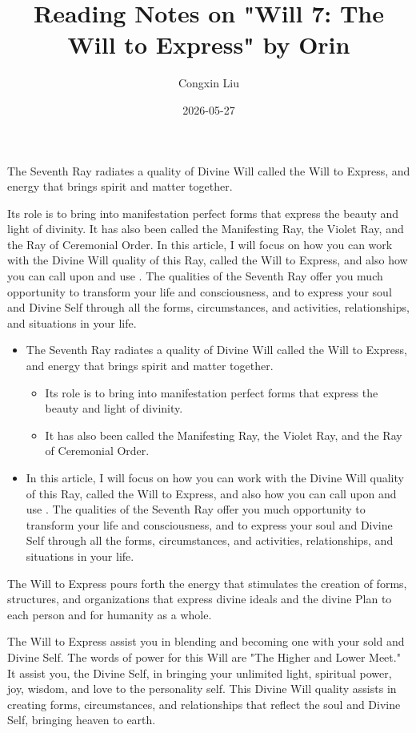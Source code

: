 \documentclass{pensee}
\title{Reading Notes on "Will 7: The Will to Express" by Orin}
\author{Congxin Liu}
\date{2026-05-27}
\begin{document}

The Seventh Ray radiates a quality of Divine Will called the Will to Express, and energy that brings spirit and matter together.

Its role is to bring into manifestation perfect forms that express the beauty and light of divinity.
It has also been called the Manifesting Ray, the Violet Ray, and the Ray of Ceremonial Order.
In this article, I will focus on how you can work with the Divine Will quality of this Ray, called the Will to Express, and also how you can call upon and use .
		\blankline
		The qualities of the Seventh Ray offer you much opportunity to transform your life and consciousness, and to express your soul and Divine Self through all the forms, circumstances, and activities, relationships, and situations in your life.

\begin{itemize}
	\item The Seventh Ray radiates a quality of Divine Will called the Will to Express, and energy that brings spirit and matter together.
		\begin{itemize}
			\item Its role is to bring into manifestation perfect forms that express the beauty and light of divinity.
			\item It has also been called the Manifesting Ray, the Violet Ray, and the Ray of Ceremonial Order.
		\end{itemize}
	\item In this article, I will focus on how you can work with the Divine Will quality of this Ray, called the Will to Express, and also how you can call upon and use .
		\blankline
		The qualities of the Seventh Ray offer you much opportunity to transform your life and consciousness, and to express your soul and Divine Self through all the forms, circumstances, and activities, relationships, and situations in your life.
\end{itemize}

The Will to Express pours forth the energy that stimulates the creation of forms, structures, and organizations that express divine ideals and the divine Plan to each person and for humanity as a whole.

The Will to Express assist you in blending and becoming one with your sold and Divine Self. The words of power for this Will are "The Higher and Lower Meet." It assist you, the Divine Self, in bringing your unlimited light, spiritual power, joy, wisdom, and love to the personality self. This Divine Will quality assists in creating forms, circumstances, and relationships that reflect the soul and Divine Self, bringing heaven to earth.
\end{document}

